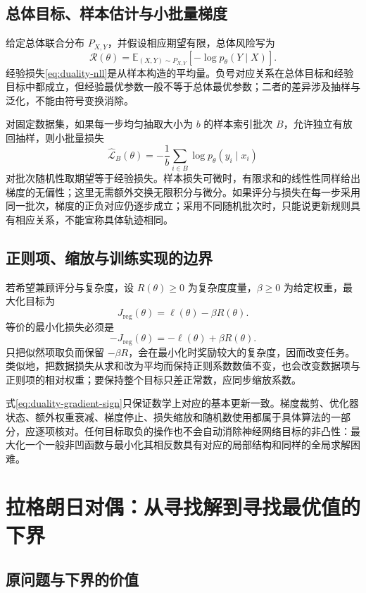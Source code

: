 \documentclass[UTF8,12pt,a4paper,fontset=fandol]{ctexart}
\begin{document}
\subsection{总体目标、样本估计与小批量梯度}

给定总体联合分布 $P_{X,Y}$，并假设相应期望有限，总体风险写为
\[
 \mathcal R(\theta)=\mathbb E_{(X,Y)\sim P_{X,Y}}
 [-\log p_\theta(Y\mid X)].
\]
经验损失\eqref{eq:duality-nll}是从样本构造的平均量。负号对应关系在总体目标和经验目标中都成立，但经验最优参数一般不等于总体最优参数；二者的差异涉及抽样与泛化，不能由符号变换消除。

对固定数据集，如果每一步均匀抽取大小为 $b$ 的样本索引批次 $B$，允许独立有放回抽样，则小批量损失
\[
 \widehat{\mathcal L}_B(\theta)
 =-\frac1b\sum_{i\in B}\log p_\theta(y_i\mid x_i)
\]
对批次随机性取期望等于经验损失。样本损失可微时，有限求和的线性性同样给出梯度的无偏性；这里无需额外交换无限积分与微分。如果评分与损失在每一步采用同一批次，梯度的正负对应仍逐步成立；采用不同随机批次时，只能说更新规则具有相应关系，不能宣称具体轨迹相同。

\subsection{正则项、缩放与训练实现的边界}

若希望兼顾评分与复杂度，设 $R(\theta)\geq0$ 为复杂度度量，$\beta\geq0$ 为给定权重，最大化目标为
\[
 J_{\mathrm{reg}}(\theta)=\ell(\theta)-\beta R(\theta).
\]
等价的最小化损失必须是
\begin{equation}
 -J_{\mathrm{reg}}(\theta)=-\ell(\theta)+\beta R(\theta).
 \label{eq:duality-regularization-sign}
\end{equation}
只把似然项取负而保留 $-\beta R$，会在最小化时奖励较大的复杂度，因而改变任务。类似地，把数据损失从求和改为平均而保持正则系数数值不变，也会改变数据项与正则项的相对权重；要保持整个目标只差正常数，应同步缩放系数。

式\eqref{eq:duality-gradient-sign}只保证数学上对应的基本更新一致。梯度裁剪、优化器状态、额外权重衰减、梯度停止、损失缩放和随机数使用都属于具体算法的一部分，应逐项核对。任何目标取负的操作也不会自动消除神经网络目标的非凸性：最大化一个一般非凹函数与最小化其相反数具有对应的局部结构和同样的全局求解困难。

\section{拉格朗日对偶：从寻找解到寻找最优值的下界}
\label{sec:duality-lagrange}

\subsection{原问题与下界的价值}
\end{document}
